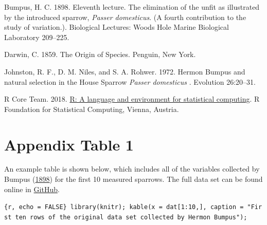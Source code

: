\documentclass[
]{article}
\newlength{\cslhangindent}
\newlength{\cslentryspacingunit} %
\newenvironment{CSLReferences}[2] %
 {%
  \setlength{\parindent}{0pt}
  \ifodd #1
  \let\oldpar\par
  \def\par{\hangindent=\cslhangindent\oldpar}
  \fi
  \setlength{\parskip}{#2\cslentryspacingunit}
 }%
 {}
\begin{document}
\hypertarget{refs}{}
\begin{CSLReferences}{1}{0}
\leavevmode{}%
Bumpus, H. C. 1898. {Eleventh lecture. The elimination of the unfit as
illustrated by the introduced sparrow, {\emph{Passer domesticus}}. (A
fourth contribution to the study of variation.)}. Biological Lectures:
Woods Hole Marine Biological Laboratory 209--225.

\leavevmode{}%
Darwin, C. 1859. {The Origin of Species}. Penguin, New York.

\leavevmode{}%
Johnston, R. F., D. M. Niles, and S. A. Rohwer. 1972. {Hermon Bumpus and
natural selection in the House Sparrow {\emph{Passer domesticus}} }.
Evolution 26:20--31.

\leavevmode{}%
R Core Team. 2018. \href{https://www.R-project.org/}{R: A language and
environment for statistical computing}. R Foundation for Statistical
Computing, Vienna, Austria.

\end{CSLReferences}

\hypertarget{appendix-table-1}{%
\section{Appendix Table 1}\label{appendix-table-1}}

An example table is shown below, which includes all of the variables
collected by Bumpus (\protect\hyperlink{ref-Bumpus1898}{1898}) for the
first 10 measured sparrows. The full data set can be found online in
\href{https://github.com/StirlingCodingClub/Manuscripts_in_Rmarkdown/blob/master/data/Bumpus_data.csv}{GitHub}.

\texttt{\{r,\ echo\ =\ FALSE\}\ library(knitr);\ kable(x\ =\ dat{[}1:10,{]},\ caption\ =\ "First\ ten\ rows\ of\ the\ original\ data\ set\ collected\ by\ Hermon\ Bumpus");}
\end{document}
